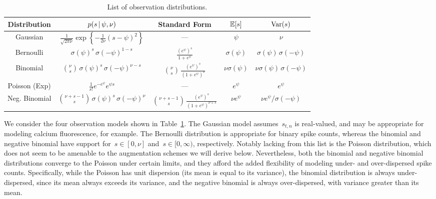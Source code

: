 \begin{table}
\begin{center}
\begin{tabular}{c|c|c|c|c}
  \textbf{Distribution} & $p(s \,|\, \psi, \nu)$ & Standard Form & $\mathbb{E}[s]$ & $\mathrm{Var}(s)$ \\
  \hline
  Gaussian & $\frac{1}{\sqrt{2 \pi \nu}}\exp \left \{ -\frac{1}{2 \nu} (s - \psi)^2 \right \}$
  & --- 
  & $\psi$ & $\nu$ \\
  Bernoulli & $\sigma(\psi)^s \, \sigma(-\psi)^{1-s}$
  & $\frac{(e^\psi)^s}{1+e^\psi}$
  & $\sigma(\psi)$ & $\sigma(\psi) \, \sigma(-\psi)$ \\
  Binomial & ${\nu \choose s} \, \sigma(\psi)^s \, \sigma(-\psi)^{\nu-s}$
  & ${\nu \choose s} \,\frac{(e^\psi)^s}{(1+e^\psi)^\nu}$
  & $\nu \sigma(\psi)$ & $\nu \sigma(\psi) \, \sigma(-\psi)$ \\
  Poisson (Exp) & $\frac{1}{s!} e^{-e^\psi} e^{\psi  s}$
  & ---
  & $e^\psi$ & $e^\psi$ \\
  Neg. Binomial & ${\nu + s -1 \choose s} \, \sigma(\psi)^s \, \sigma(-\psi)^{\nu}$
  & ${\nu +s - 1 \choose s} \,\frac{(e^\psi)^s}{(1+e^\psi)^{\nu+s}}$
  & $\nu e^\psi$ & $\nu e^\psi / \sigma(-\psi)$ \\
\end{tabular}
\end{center}
\caption{List of observation distributions.}
\label{tab:obs_models}
\end{table}


We consider the four observation models shown in Table~\ref{tab:obs_models}.
The Gaussian model assumes~$s_{t,n}$ is real-valued, and may be
appropriate for modeling calcium fluorescence, for example.
The Bernoulli distribution is appropriate for binary spike counts,
whereas the binomial and negative binomial have support
for~$s\in[0,\nu]$ and~$s \in [0, \infty)$, respectively.
Notably lacking from this list is the Poisson distribution,
which does not seem to be amenable to the augmentation schemes
we will derive below. Nevertheless, both the binomial and negative
binomial distributions converge to the Poisson under certain
limits, and they afford the added flexibility of modeling under- and
over-dispersed spike counts. Specifically, while the Poisson has unit 
dispersion (its mean is equal to its variance), the binomial distribution 
is always under-dispersed, since its mean always exceeds its variance, 
and the negative binomial is always over-dispersed, with variance greater 
than its mean.

